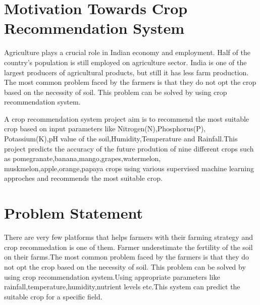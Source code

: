 \section{Motivation Towards Crop Recommendation System}
     Agriculture plays a crucial role in Indian economy and employment. Half of the country's population is still employed on agriculture sector. India is one of the largest producers of agricultural products, but still it has less farm production. The most common problem faced by the farmers is that they do not opt the crop based on the necessity of soil. This problem can be solved by using crop recommendation system.\par
     A crop recommendation system project aim is to recommend the most suitable crop based on input parameters like Nitrogen(N),Phosphorus(P),
Potassium(K),pH value of the soil,Humidity,Temperature and Rainfall.This project predicts the accuracy of the future prodution of nine different crops such as pomegranate,banana,mango,grapes,watermelon,
muskmelon,apple,orange,papaya crops using various supervised machine learning approches and recommends the most suitable crop.
\section{Problem Statement}
     There are very few platforms that helps farmers with their farming strategy and crop recommedation is one of them. Farmer understimate the fertility of the soil on their farms.The most common problem faced by the farmers is that they do not opt the crop based on the necessity of soil. This problem can be solved by using crop recommendation system.Using appropriate parameters like rainfall,temperature,humidity,nutrient levels etc.This system can predict the suitable crop for a specific field.











